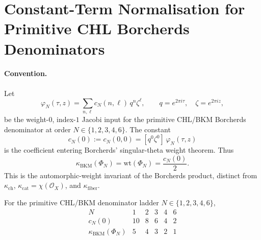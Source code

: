 \section{Constant-Term Normalisation for Primitive CHL Borcherds Denominators}
\label{sec:cn-zero-primitive-chl-normalisation}

\providecommand{\cO}{\mathcal{O}}
\providecommand{\kBKM}{\kappa_{\mathrm{BKM}}}
\providecommand{\kch}{\kappa_{\mathrm{ch}}}
\providecommand{\kcat}{\kappa_{\mathrm{cat}}}
\providecommand{\kfib}{\kappa_{\mathrm{fiber}}}

\paragraph{Convention.}
Let
\[
  \varphi_N(\tau,z)
  =\sum_{n,\ell} c_N(n,\ell)\,q^n\zeta^\ell,
  \qquad q=e^{2\pi i\tau},\quad \zeta=e^{2\pi iz},
\]
be the weight-$0$, index-$1$ Jacobi input for the primitive
CHL/BKM Borcherds denominator at order
$N\in\{1,2,3,4,6\}$.  The constant
\[
  c_N(0):=c_N(0,0)=[q^0\zeta^0]\,\varphi_N(\tau,z)
\]
is the coefficient entering Borcherds' singular-theta weight theorem.
Thus
\[
  \kBKM(\Phi_N)=\mathrm{wt}(\Phi_N)=\frac{c_N(0)}{2}.
\]
This is the automorphic-weight invariant of the Borcherds product,
distinct from $\kch$, $\kcat=\chi(\cO_X)$, and $\kfib$.

\begin{theorem}
\label{thm:cn-zero-primitive-chl-normalisation}
For the primitive CHL/BKM denominator ladder
$N\in\{1,2,3,4,6\}$,
\[
  \begin{array}{c|ccccc}
  N & 1 & 2 & 3 & 4 & 6 \\ \hline
  c_N(0) & 10 & 8 & 6 & 4 & 2 \\
  \kBKM(\Phi_N) & 5 & 4 & 3 & 2 & 1
  \end{array}
\]
\end{theorem}

